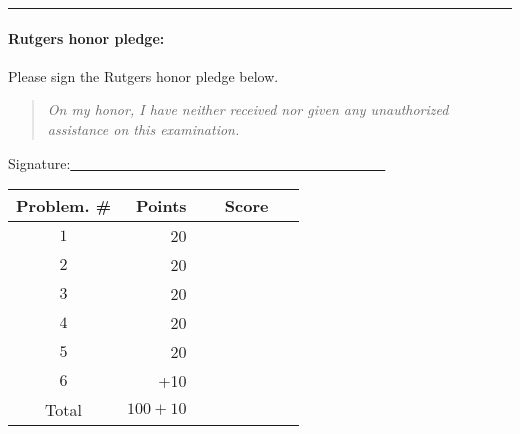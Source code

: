 \documentclass{article}
\theoremstyle{definition}
\def\fline{\rule{0.75\linewidth}{0.5pt}}
\newcommand{\finishline}{\vspace{-15pt}\begin{center}\fline\end{center}}
\begin{document}
\finishline

\paragraph{Rutgers honor pledge:} Please sign the Rutgers honor pledge below. 

\begin{quote}
\emph{On my honor, I have neither received nor given any unauthorized assistance on this
examination.} 
\end{quote}
\hfill{Signature:\underline{~~~~~~~~~~~~~~~~~~~~~~~~~~~~~~~~~~~~~~~~~~~~~}}

\bigskip

\begin{center}
\begin{tabular}{|c|r|c|}
\hline
Problem. \# & Points & Score \\ \hline\hline
$1$ & 20 & ~~~~~~~~~~~\\  \hline
$2$ & 20 & \\ \hline
$3$ & 20 & \\ \hline
$4$ & 20 & \\ \hline
$5$ & 20 & \\ \hline
$6$ & +10 & \\ \hline
Total & $100 + 10$ & \\ \hline
\end{tabular}
\end{center}

\newpage
\end{document}
